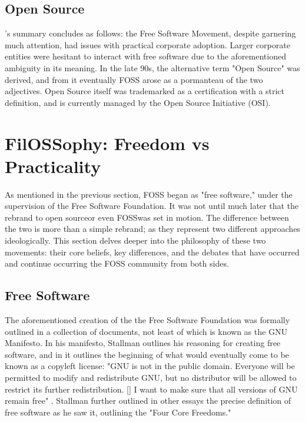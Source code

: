 \documentclass[manuscript,screen,nonacm,12pt]{acmart}
\begin{document}
\subsection{Open Source}
\label{sec:hist-osi}
\citeauthor{Fortunato2021}'s \citeyear{Fortunato2021} summary concludes as
follows: the Free Software Movement, despite garnering much attention, had
issues with practical corporate adoption. Larger corporate entities were
hesitant to interact with free software due to the aforementioned ambiguity in
its meaning. In the late 90s, the alternative term "Open Source" was derived,
and from it eventually FOSS arose as a pormanteau of the two adjectives. Open
Source itself was trademarked as a certification with a strict definition, and
is currently managed by the Open Source Initiative (OSI).

\section{FilOSSophy: Freedom vs Practicality}
As mentioned in the previous section, FOSS began as "free software," under the
supervision of the Free Software Foundation. It was not until much later that
the rebrand to open source\textemdash or even FOSS\textemdash was set in motion.
The difference between the two is more than a simple rebrand; as they represent
two different approaches ideologically. This section delves deeper into the
philosophy of these two movements: their core beliefs, key differences, and the
debates that have occurred and continue occurring the FOSS community from both
sides.

\subsection{Free Software}
\label{sec:hist-gnu2}
The aforementioned creation of the the Free Software Foundation was formally
outlined in a collection of documents, not least of which is known as the GNU
Manifesto. In his manifesto, Stallman outlines his reasoning for creating free
software, and in it outlines the beginning of what would eventually come to be
known as a copyleft license: "GNU is not in the public domain. Everyone will be
permitted to modify and redistribute GNU, but no distributor will be allowed to
restrict its further redistribution. [\textellipsis] I want to make sure that
all versions of GNU remain free" \cite{stallman1985}. Stallman further outlined
in other essays the precise definition of free software as he saw it, outlining
the "Four Core Freedoms."
\end{document}
